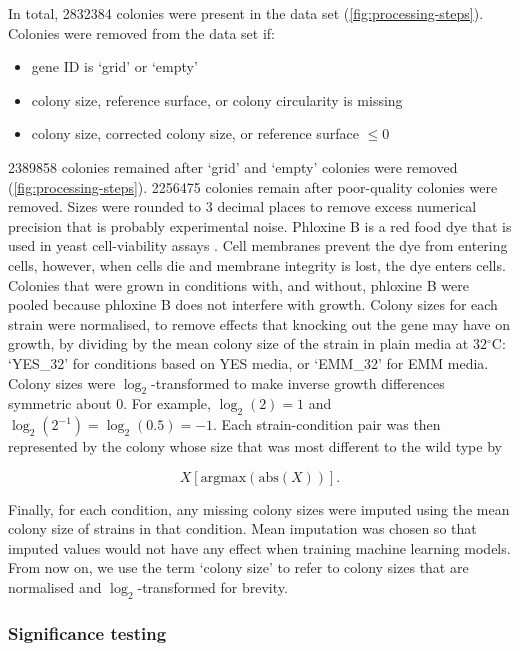 In total, \num{2832384} colonies were present in the data set (\ref{fig:processing-steps}). Colonies were removed from the data set if:

\begin{itemize}
    \item gene ID is `grid' or `empty'
    \item colony size, reference surface, or colony circularity is missing
    \item colony size, corrected colony size, or reference surface $\le 0$
\end{itemize}

\num{2389858} colonies remained after `grid' and `empty' colonies were removed (\ref{fig:processing-steps}). \num{2256475} colonies remain after poor-quality colonies were removed. Sizes were rounded to $3$ decimal places to remove excess numerical precision that is probably experimental noise. Phloxine B is a red food dye that is used in yeast cell-viability assays \cite{Noda2009}. Cell membranes prevent the dye from entering cells, however, when cells die and membrane integrity is lost, the dye enters cells. Colonies that were grown in conditions with, and without, phloxine B were pooled because phloxine B does not interfere with growth. Colony sizes for each strain were normalised, to remove effects that knocking out the gene may have on growth, by dividing by the mean colony size of the strain in plain media at $32$$^{\circ}$C: `YES\_32' for conditions based on YES media, or `EMM\_32' for EMM media. Colony sizes were $\log_2$-transformed to make inverse growth differences symmetric about $0$. For example, $\log_2(2) = 1$ and $\log_2(2^{-1}) = \log_2(0.5) = -1$. Each strain-condition pair was then represented by the colony whose size that was most different to the wild type by

\begin{equation}
    \label{eqn:argmax_abs}
    X[\text{argmax}(\text{abs}(X))].
\end{equation}

Finally, for each condition, any missing colony sizes were imputed using the mean colony size of strains in that condition. Mean imputation was chosen so that imputed values would not have any effect when training machine learning models. From now on, we use the term `colony size' to refer to colony sizes that are normalised and $\log_2$-transformed for brevity.

\subsubsection{Significance testing}

